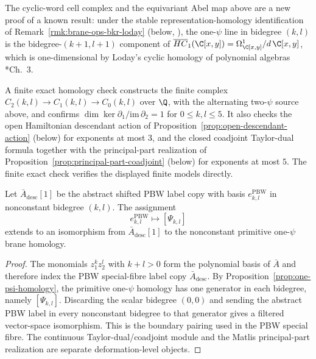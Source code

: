 \documentclass[11pt]{memoir}
\begin{document}
\begin{rmk}
\label{rmk:one-psi-known-computation}
  The cyclic-word cell complex and the equivariant Abel map above are a
  new proof of a known result: under the stable
  representation-homology identification of
  Remark~\ref{rmk:brane-ops-bkr-loday} (below,
  \cite{berest-khachatryan-ramadoss}), the one-\(\psi\) line in
  bidegree \((k,l)\) is the bidegree-\((k+1,l+1)\) component of
  \(\overline{HC}_1(\C[x,y])=\Omega^1_{\C[x,y]}/d\,\C[x,y]\), which is
  one-dimensional by Loday's cyclic homology of polynomial algebras
  \cite{loday-cyclic-homology}*{Ch.~3}.
\end{rmk}

\begin{rmk}
  A finite exact homology check constructs the
  finite complex $C_2(k,l)\to C_1(k,l)\to C_0(k,l)$ over $\Q$, with the
  alternating two-$\psi$ source above, and confirms
  $\dim\ker\partial_1/\mathrm{im}\,\partial_2=1$ for $0\leq k,l\leq5$. It
  also checks the open Hamiltonian descendant action of
  Proposition~\ref{prop:open-descendant-action} (below) for exponents at most
  $3$, and the closed coadjoint Taylor-dual formula together with the
  principal-part realization of Proposition~\ref{prop:principal-part-coadjoint}
  (below) for exponents at most $5$. The finite exact check verifies the displayed
  finite models directly.
\end{rmk}

\begin{cor}\label{cor:cotangent-boundary-pairing}
  Let $\bar A_{\mathrm{desc}}[1]$ be the abstract shifted PBW label copy
  with basis $e^{\mathrm{PBW}}_{k,l}$ in nonconstant bidegree $(k,l)$.
  The assignment
  $$e^{\mathrm{PBW}}_{k,l}\longmapsto [\Psi_{k,l}]$$
  extends to an isomorphism from $\bar A_{\mathrm{desc}}[1]$ to the
  nonconstant primitive one-$\psi$ brane homology.
\end{cor}

\begin{proof}
  The monomials $z_1^kz_2^l$ with $k+l>0$ form the polynomial basis of
  $\bar A$ and therefore index the PBW special-fibre label copy
  $\bar A_{\mathrm{desc}}$. By
  Proposition~\ref{prop:one-psi-homology}, the primitive one-$\psi$ homology has
  one generator in each bidegree, namely $[\Psi_{k,l}]$. Discarding the scalar
  bidegree $(0,0)$ and sending the abstract PBW label in every nonconstant
  bidegree to that generator gives a filtered vector-space isomorphism. This is
  the boundary pairing used in the PBW special fibre. The continuous
  Taylor-dual/coadjoint module and the Matlis principal-part realization
  are separate deformation-level objects.
\end{proof}
\end{document}
